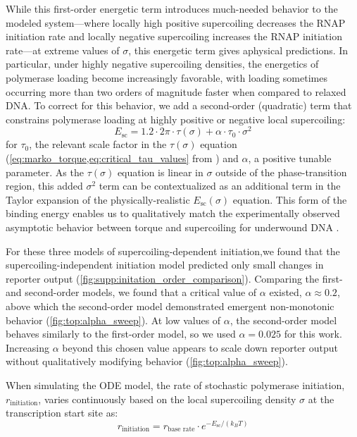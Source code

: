 \documentclass[11pt]{article}
\begin{document}
While this first-order energetic term introduces much-needed behavior to the modeled system---where locally high positive supercoiling decreases the RNAP initiation rate and locally negative supercoiling increases the RNAP initiation rate---at extreme values of \(\sigma\), this energetic term gives aphysical predictions. In particular, under highly negative supercoiling densities, the energetics of polymerase loading become increasingly favorable, with loading sometimes occurring more than two orders of magnitude faster when compared to relaxed DNA. To correct for this behavior, we add a second-order (quadratic) term that constrains polymerase loading at highly positive or negative local supercoiling:
\begin{equation}
    E_\text{sc} = 1.2  \cdot 2\pi \cdot \tau(\sigma) + \alpha \cdot \tau_0 \cdot \sigma^2
\label{eq:second_order_sc_initation}
\end{equation}
for \(\tau_0\), the relevant scale factor in the \(\tau(\sigma)\) equation (\cref{eq:marko_torque,eq:critical_tau_values} from \parencite{markoTorqueDynamicsLinking2007}) and \(\alpha\), a positive tunable parameter. As the \(\tau(\sigma)\) equation is linear in \(\sigma\) outside of the phase-transition region, this added \(\sigma^2\) term can be contextualized as an additional term in the Taylor expansion of the physically-realistic \(E_\text{sc}(\sigma)\) equation. This form of the binding energy enables us to qualitatively match the experimentally observed asymptotic behavior between torque and supercoiling for underwound DNA \parencite{leSynergisticCoordinationChromatin2019}.

For these three models of supercoiling-dependent initiation,we found that the supercoiling-independent initiation model predicted only small changes in reporter output (\cref{fig:supp:initation_order_comparison}). Comparing the first- and second-order models, we found that a critical value of \(\alpha\) existed, \(\alpha \approx 0.2\), above which the second-order model demonstrated emergent non-monotonic behavior (\cref{fig:top:alpha_sweep}). At low values of \(\alpha\), the second-order model behaves similarly to the first-order model, so we used \(\alpha = 0.025\) for this work. Increasing \(\alpha\) beyond this chosen value appears to scale down reporter output without qualitatively modifying behavior (\cref{fig:top:alpha_sweep}).

When simulating the ODE model, the rate of stochastic polymerase initiation, \(r_\text{initiation}\), varies continuously based on the local supercoiling density \(\sigma\) at the transcription start site as:
\begin{equation}
    r_\text{initiation} = r_\text{base rate} \cdot e^{- E_\text{sc} / (k_B T)}
\label{eq:intermediate_init_rate}
\end{equation}
\end{document}
